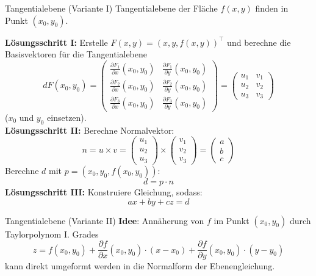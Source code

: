 \begin{Rezept}{Tangentialebene (Variante I)}{}
    Tangentialebene der Fläche $f(x, y)$ finden in Punkt $(x_0, y_0)$.
    
    \textbf{Lösungsschritt I:}
    Erstelle $F(x, y) = (x, y, f(x, y))^\top$ und berechne die
    Basisvektoren für die Tangentialebene
    \[
        dF(x_0, y_0) =
            \begin{pmatrix}
                \frac{\partial F_1}{\partial x}(x_0, y_0)&\frac{\partial F_1}{\partial y}(x_0, y_0)\\
                \frac{\partial F_2}{\partial x}(x_0, y_0)&\frac{\partial F_2}{\partial y}(x_0, y_0)\\
                \frac{\partial F_3}{\partial x}(x_0, y_0)&\frac{\partial F_3}{\partial y}(x_0, y_0)
            \end{pmatrix} = 
            \begin{pmatrix}
                u_1&v_1\\
                u_2&v_2\\
                u_3&v_3
            \end{pmatrix}
    \]
    ($x_0$ und $y_0$ einsetzen).\\
    \textbf{Lösungsschritt II:}
    Berechne Normalvektor:
    \[
        n =
        u \times v =
        \begin{pmatrix}
            u_1\\
            u_2\\
            u_3
        \end{pmatrix}
        \times
        \begin{pmatrix}
            v_1\\
            v_2\\
            v_3
        \end{pmatrix} = 
        \begin{pmatrix}
            a\\
            b\\
            c
        \end{pmatrix}
    \]
    Berechne $d$ mit $p=(x_0,y_0,f(x_0,y_0))$:
    \[
        d=p \cdot n
    \]
    \textbf{Lösungsschritt III:} Konstruiere Gleichung, sodass:
    \[
        ax + by + cz = d
    \]
\end{Rezept}

\begin{Rezept}{Tangentialebene (Variante II)}{}
\textbf{Idee}: Annäherung von $f$ im Punkt $(x_0, y_0)$ durch Taylorpolynom I. Grades
\[ z = f(x_0, y_0) + \frac{\partial f}{\partial x}(x_0, y_0)\cdot(x-x_0) + \frac{\partial f}{\partial y}(x_0, y_0)\cdot(y-y_0) \]
kann direkt umgeformt werden in die Normalform der Ebenengleichung.
\end{Rezept}

